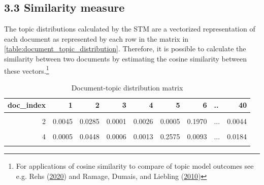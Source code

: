 \documentclass[
  12pt,
]{article}
\begin{document}
\hypertarget{similarity-measure}{%
\subsection{3.3 Similarity measure}\label{similarity-measure}}

The topic distributions calculated by the STM are a vectorized
representation of each document as represented by each row in the matrix
in \autoref{table:document_topic_distribution}. Therefore, it is
possible to calculate the similarity between two documents by estimating
the cosine similarity between these vectors.\footnote{For applications
  of cosine similarity to compare of topic model outcomes see e.g. Rehs
  (\protect\hyperlink{ref-rehs_structural_2020}{2020}) and Ramage,
  Dumais, and Liebling
  (\protect\hyperlink{ref-ramage_characterizing_2010}{2010})}

\begin{table}[H]

\caption{\label{tab:Document-topic distribution matrix - sample values}Document-topic distribution matrix \label{table:document_topic_distribution}}
\centering
\fontsize{7}{9}\selectfont
\begin{tabular}[t]{rrrrrrrlr}
\toprule
doc\_index & 1 & 2 & 3 & 4 & 5 & 6 & .. & 40\\
\midrule
\cellcolor{gray!6}{1} & \cellcolor{gray!6}{0.0006} & \cellcolor{gray!6}{0.0461} & \cellcolor{gray!6}{0.0008} & \cellcolor{gray!6}{0.0015} & \cellcolor{gray!6}{0.2259} & \cellcolor{gray!6}{0.0118} & \cellcolor{gray!6}{...} & \cellcolor{gray!6}{0.0195}\\
2 & 0.0045 & 0.0285 & 0.0001 & 0.0026 & 0.0005 & 0.1970 & ... & 0.0044\\
\cellcolor{gray!6}{3} & \cellcolor{gray!6}{0.0044} & \cellcolor{gray!6}{0.0040} & \cellcolor{gray!6}{0.0017} & \cellcolor{gray!6}{0.0006} & \cellcolor{gray!6}{0.0046} & \cellcolor{gray!6}{0.0191} & \cellcolor{gray!6}{...} & \cellcolor{gray!6}{0.0894}\\
4 & 0.0005 & 0.0448 & 0.0006 & 0.0013 & 0.2575 & 0.0093 & ... & 0.0184\\
\cellcolor{gray!6}{5} & \cellcolor{gray!6}{0.0003} & \cellcolor{gray!6}{0.0534} & \cellcolor{gray!6}{0.0004} & \cellcolor{gray!6}{0.0012} & \cellcolor{gray!6}{0.2859} & \cellcolor{gray!6}{0.0099} & \cellcolor{gray!6}{...} & \cellcolor{gray!6}{0.0142}\\
\bottomrule
\end{tabular}
\end{table}
\end{document}
